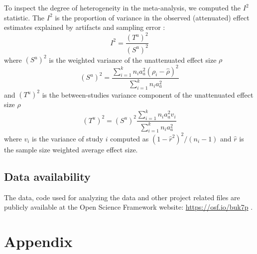 \documentclass[english,natbib,man,floatsintext]{apa6}
\begin{document}
To inspect the degree of heterogeneity in the meta-analysis, we computed the $I^2$ statistic. The $I^2$ is the proportion of variance in the observed (attenuated) effect estimates explained by artifacts and sampling error \citep{borenstein2011introduction}: 
%
\begin{equation}
\label{eq:i2_statistic}
I^2 = \frac{(T^u)^2}{(S^u)^2}
\end{equation}
%
where $(S^u)^2$ is the weighted variance of the unattenuated effect size $\rho$
%
\begin{equation}
\label{eq:Su2_var}
(S^u)^2 = \frac{\sum_{i=1}^k n_i a_a^2 (\rho_i - \hat{\rho})^2}{\sum_{i=1}^k n_i a_a^2}
\end{equation}
%
and $(T^u)^2$ is the between-studies variance component of the unattenuated effect size $\rho$
%
\begin{equation}
\label{eq:Tu2_var}
(T^u)^2 = (S^u)^2 \frac{\sum_{i=1}^k n_i a_a^2 v_i}{\sum_{i=1}^k n_i a_a^2}
\end{equation}
%
where $v_i$ is the variance of study $i$ computed as $(1 - \hat{r}^2)^2 / (n_i - 1)$ and $\hat{r}$ is the sample size weighted average effect size.


\subsection{Data availability}

The data, code used for analyzing the data and other project related files are publicly available at the Open Science Framework website: \url{https://osf.io/buk7p} \citep{osfrepo}.









\FloatBarrier
\section{Appendix}
\label{appendix}
\end{document}

